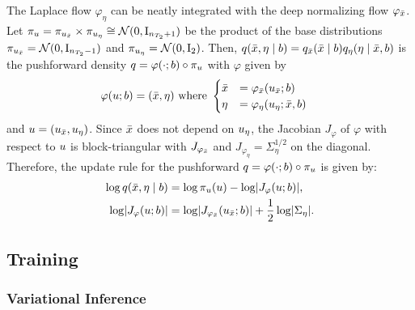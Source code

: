 The Laplace flow $\varphi_{\eta}$ can be neatly integrated with the deep normalizing flow $\varphi_{\bar{x}}$.
Let $\pi_{u} = \pi_{u_{\bar{x}}} \times \pi_{u_{\eta}} \cong \mathcal{N}(\mathrm{0}, \mathrm{I}_{n_{T_2}+1})$ be the product of the base distributions $\pi_{u_{\bar{x}}} = \mathcal{N}(\mathrm{0}, \mathrm{I}_{n_{T_2}-1})$ and $\pi_{u_{\eta}} = \mathcal{N}(\mathrm{0}, \mathrm{I}_{2})$.
Then, $q(\bar{x}, \eta \mid b) = q_{\bar{x}}(\bar{x} \mid b) q_{\eta}(\eta \mid \bar{x}, b)$ is the pushforward density $q = \varphi(\cdot; b) \circ \pi_{u}$ with $\varphi$ given by
\begin{align}\label{eqn:joint_flow}
    \varphi(u; b) & = (\bar{x}, \eta)
    \text{ where }
    \begin{cases}
        \bar{x} & = \varphi_{\bar{x}}(u_{\bar{x}}; b) \\
        \eta          & = \varphi_{\eta}(u_{\eta}; \bar{x}, b)
    \end{cases}
\end{align}
and $u = (u_{\bar{x}}, u_{\eta})$.
Since $\bar{x}$ does not depend on $u_{\eta}$, the Jacobian $J_{\varphi}$ of $\varphi$ with respect to $u$ is block-triangular with $J_{\varphi_{\bar{x}}}$ and $J_{\varphi_{\eta}} = \Sigma_{\eta}^{1/2}$ on the diagonal.
Therefore, the update rule for the pushforward $q = \varphi(\cdot; b) \circ \pi_{u}$ is given by:
\begin{align}\label{eqn:joint_flow_density}
    \begin{split}
        \log q(\bar{\distbn}, \eta \mid \signal)          & = \log \pi_{\vv{u}}(\vv{u}) - \log \AbsDet{\vv{J}_{\varphi}(\vv{u}; \signal)},                                 \\
        \log \AbsDet{\vv{J}_{\varphi}(\vv{u}; \signal)} & = \log \AbsDet{\vv{J}_{\varphi_{\bar{\distbn}}}(\vv{u}_{\bar{\distbn}}; \signal)} + \frac{1}{2} \log \AbsDet{\Sigma_{\eta}}.
    \end{split}
\end{align}

\subsection{Training}

\subsubsection{Variational Inference}\label{subsubsec:variational_inference}

